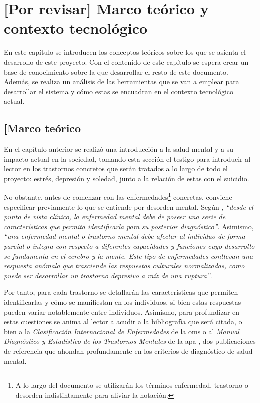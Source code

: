 \chapter{[Por revisar] Marco teórico y contexto tecnológico}
\label{chapter:marco_teorico}


En este capítulo se introducen los conceptos teóricos sobre los que se asienta el desarrollo de este proyecto. Con el contenido de este capítulo se espera crear un base de conocimiento sobre la que desarrollar el resto de este documento. Además, se realiza un análisis de las herramientas que se van a emplear para desarrollar el sistema y cómo estas se encuadran en el contexto tecnológico actual.

\section{[Marco teórico}
    \label{section:marco_teorico}

    En el capítulo anterior se realizó una introducción a la salud mental y a su impacto actual en la sociedad, tomando esta sección el testigo para introducir al lector en los trastornos concretos que serán tratados a lo largo de todo el proyecto: estrés, depresión y soledad, junto a la relación de estas con el suicidio.

    No obstante, antes de comenzar con las enfermedades\footnote{A lo largo del documento se utilizarán los términos enfermedad, trastorno o desorden indistintamente para aliviar la notación.} concretas, conviene especificar previamente lo que se entiende por desorden mental. Según \cite{ortega_gonzalez_enfermedades_2021}, \textit{``desde el punto de vista clínico, la enfermedad mental debe de poseer una serie de características que permita identificarla para su posterior diagnóstico''}. Asimismo, \textit{``una enfermedad mental o trastorno mental debe afectar al individuo de forma parcial o íntegra con respecto a diferentes capacidades y funciones cuyo desarrollo se fundamenta en el cerebro y la mente. Este tipo de enfermedades conllevan una respuesta anómala que trasciende las respuestas culturales normalizadas, como puede ser desarrollar un trastorno depresivo a raíz de una ruptura''}.

    Por tanto, para cada trastorno se detallarán las características que permiten identificarlas y cómo se manifiestan en los individuos, si bien estas respuestas pueden variar notablemente entre individuos. Asimismo, para profundizar en estas cuestiones se anima al lector a acudir a la bibliografía que será citada, o bien a la \textit{Clasificación Internacional de Enfermedades} de la \gls{oms} \cite{oms_clasificacion_nodate} o al \textit{Manual Diagnóstico y Estadístico de los Trastornos Mentales} de la \gls{apa} \cite{american_psychological_association_manual_2014}, dos publicaciones de referencia que ahondan profundamente en los criterios de diagnóstico de salud mental.

